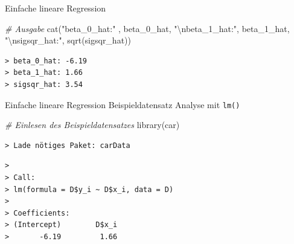 \documentclass[
  8pt,
  ignorenonframetext,
]{beamer}
\newenvironment{Shaded}{\begin{snugshade}}{\end{snugshade}}
\newcommand{\AttributeTok}[1]{\textcolor[rgb]{0.77,0.63,0.00}{#1}}
\newcommand{\CommentTok}[1]{\textcolor[rgb]{0.56,0.35,0.01}{\textit{#1}}}
\newcommand{\ConstantTok}[1]{\textcolor[rgb]{0.00,0.00,0.00}{#1}}
\newcommand{\FunctionTok}[1]{\textcolor[rgb]{0.00,0.00,0.00}{#1}}
\newcommand{\NormalTok}[1]{#1}
\newcommand{\OtherTok}[1]{\textcolor[rgb]{0.56,0.35,0.01}{#1}}
\newcommand{\SpecialCharTok}[1]{\textcolor[rgb]{0.00,0.00,0.00}{#1}}
\newcommand{\StringTok}[1]{\textcolor[rgb]{0.31,0.60,0.02}{#1}}
\begin{document}
\begin{frame}[fragile]{Einfache lineare Regression}
\begin{Shaded}
\begin{Highlighting}[]
\CommentTok{\# Ausgabe}
\FunctionTok{cat}\NormalTok{(}\StringTok{"beta\_0\_hat:"}\NormalTok{  , beta\_0\_hat,}
    \StringTok{"}\SpecialCharTok{\textbackslash{}n}\StringTok{beta\_1\_hat:"}\NormalTok{, beta\_1\_hat,}
    \StringTok{"}\SpecialCharTok{\textbackslash{}n}\StringTok{sigsqr\_hat:"}\NormalTok{, }\FunctionTok{sqrt}\NormalTok{(sigsqr\_hat))}
\end{Highlighting}
\end{Shaded}

\begin{verbatim}
> beta_0_hat: -6.19 
> beta_1_hat: 1.66 
> sigsqr_hat: 3.54
\end{verbatim}
\end{frame}

\begin{frame}[fragile]{Einfache lineare Regression}
\protect\hypertarget{einfache-lineare-regression-10}{}
Beispieldatensatz Analyse mit \texttt{lm()} \vspace{1mm}

\tiny

\begin{Shaded}
\begin{Highlighting}[]
\CommentTok{\# Einlesen des Beispieldatensatzes}
\FunctionTok{library}\NormalTok{(car)}
\end{Highlighting}
\end{Shaded}

\begin{verbatim}
> Lade nötiges Paket: carData
\end{verbatim}

\begin{Shaded}
\end{Shaded}

\begin{verbatim}
> 
> Call:
> lm(formula = D$y_i ~ D$x_i, data = D)
> 
> Coefficients:
> (Intercept)        D$x_i  
>       -6.19         1.66
\end{verbatim}
\end{frame}
\end{document}
